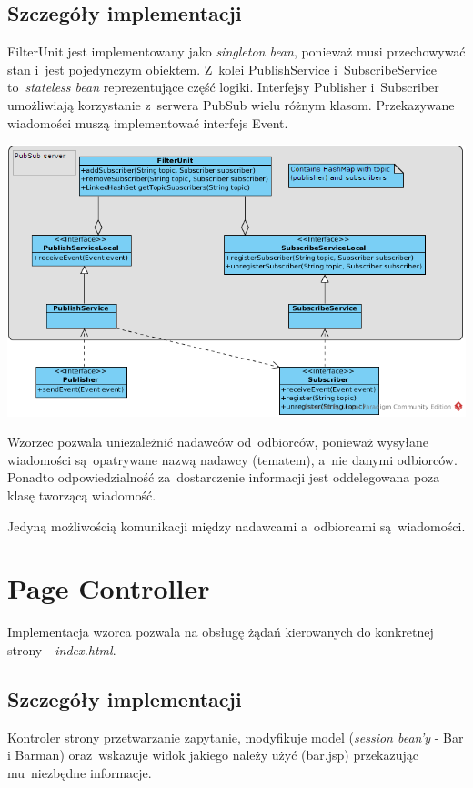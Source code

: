 \documentclass[11pt]{aghdpl}
\begin{document}
\subsection{Szczegóły implementacji}
FilterUnit jest implementowany jako \textit{singleton bean}, ponieważ musi przechowywać stan i~jest pojedynczym obiektem. Z~kolei PublishService i~SubscribeService to~\textit{stateless bean} reprezentujące część logiki. Interfejsy Publisher i~Subscriber umożliwiają korzystanie z~serwera PubSub wielu różnym klasom. Przekazywane wiadomości muszą implementować interfejs Event.

\begin{center}
 \includegraphics[width=14cm]{pubsub}
\end{center}

Wzorzec pozwala uniezależnić nadawców od~odbiorców, ponieważ wysyłane wiadomości są~opatrywane nazwą nadawcy (tematem), a~nie danymi odbiorców. Ponadto odpowiedzialność za~dostarczenie informacji jest oddelegowana poza klasę tworzącą wiadomość. 

Jedyną możliwością komunikacji między nadawcami a~odbiorcami są~wiadomości.

\section{Page Controller}
Implementacja wzorca pozwala na obsługę żądań kierowanych do konkretnej strony - \textit{index.html}. 

\subsection{Szczegóły implementacji}
Kontroler strony przetwarzanie zapytanie, modyfikuje model (\textit{session bean'y} - Bar i Barman) oraz~wskazuje widok jakiego należy użyć (bar.jsp) przekazując mu~niezbędne informacje. 
\end{document}
